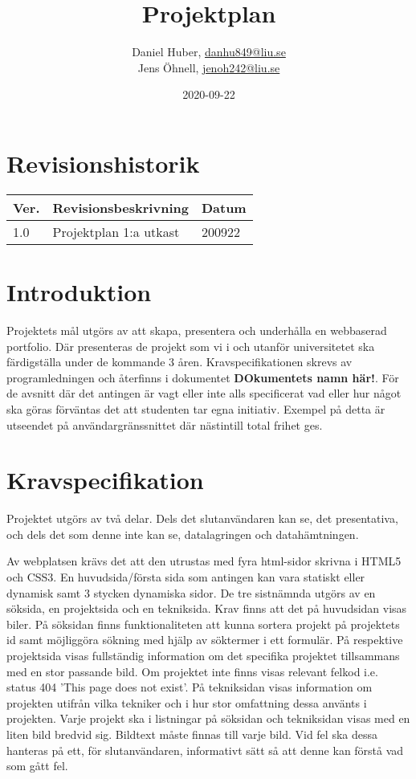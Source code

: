 \documentclass{TDP003mall}
\author{Daniel Huber, \url{danhu849@liu.se}\\
  Jens Öhnell, \url{jenoh242@liu.se}}
\title{Projektplan}
\date{2020-09-22}
\begin{document}
\projectpage
\section{Revisionshistorik}
\begin{table}[!h]
\begin{tabularx}{\linewidth}{|l|X|l|}
\hline
Ver. & Revisionsbeskrivning & Datum \\\hline
1.0 & Projektplan 1:a utkast & 200922 \\\hline
\end{tabularx}
\end{table}


\section{Introduktion}
Projektets mål utgörs av att skapa, presentera och underhålla en webbaserad portfolio. Där presenteras de projekt som vi i och utanför universitetet ska färdigställa under de kommande 3 åren. Kravspecifikationen skrevs av programledningen och återfinns i dokumentet \textbf{DOkumentets namn här!}. För de avsnitt där det antingen är vagt eller inte alls specificerat vad eller hur något ska göras förväntas det att studenten tar egna initiativ. Exempel på detta är utseendet på användargränssnittet där nästintill total frihet ges.


\section{Kravspecifikation}
Projektet utgörs av två delar. Dels det slutanvändaren kan se, det presentativa, och dels det som denne inte kan se, datalagringen och datahämtningen.

Av webplatsen krävs det att den utrustas med fyra html-sidor skrivna i HTML5 och CSS3. En huvudsida/första sida som antingen kan vara statiskt eller dynamisk samt 3 stycken dynamiska sidor. De tre sistnämnda utgörs av en söksida, en projektsida och en tekniksida. Krav finns att det på huvudsidan visas biler. På söksidan finns funktionaliteten att kunna sortera projekt på projektets id samt möjliggöra sökning med hjälp av söktermer i ett formulär. På respektive projektsida visas fullständig information om det specifika projektet tillsammans med en stor passande bild. Om projektet inte finns visas relevant felkod i.e. status 404 'This page does not exist'. På tekniksidan visas information om projekten utifrån vilka tekniker och i hur stor omfattning dessa använts i projekten. Varje projekt ska i listningar på söksidan och tekniksidan visas med en liten bild bredvid sig. Bildtext måste finnas till varje bild. Vid fel ska dessa hanteras på ett, för slutanvändaren, informativt sätt så att denne kan förstå vad som gått fel.
\end{document}
